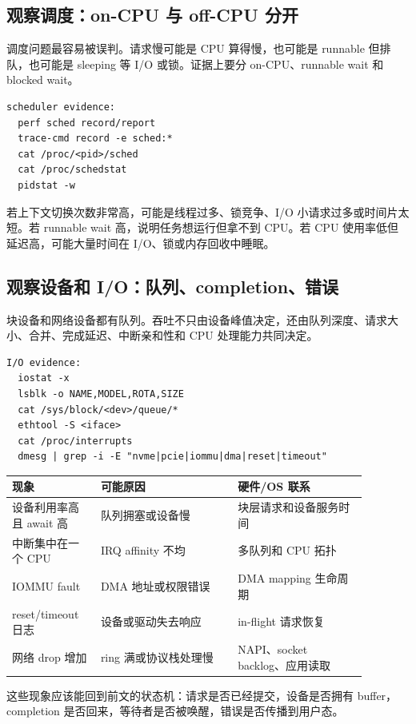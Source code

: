 \subsection{观察调度：on-CPU 与 off-CPU 分开}

调度问题最容易被误判。请求慢可能是 CPU 算得慢，也可能是 runnable 但排队，也可能是 sleeping 等 I/O 或锁。证据上要分 on-CPU、runnable wait 和 blocked wait。

\begin{lstlisting}
scheduler evidence:
  perf sched record/report
  trace-cmd record -e sched:*
  cat /proc/<pid>/sched
  cat /proc/schedstat
  pidstat -w
\end{lstlisting}

若上下文切换次数非常高，可能是线程过多、锁竞争、I/O 小请求过多或时间片太短。若 runnable wait 高，说明任务想运行但拿不到 CPU。若 CPU 使用率低但延迟高，可能大量时间在 I/O、锁或内存回收中睡眠。

\subsection{观察设备和 I/O：队列、completion、错误}

块设备和网络设备都有队列。吞吐不只由设备峰值决定，还由队列深度、请求大小、合并、完成延迟、中断亲和性和 CPU 处理能力共同决定。

\begin{lstlisting}
I/O evidence:
  iostat -x
  lsblk -o NAME,MODEL,ROTA,SIZE
  cat /sys/block/<dev>/queue/*
  ethtool -S <iface>
  cat /proc/interrupts
  dmesg | grep -i -E "nvme|pcie|iommu|dma|reset|timeout"
\end{lstlisting}

\begin{longtable}{p{0.22\linewidth}p{0.34\linewidth}p{0.32\linewidth}}
\toprule
现象 & 可能原因 & 硬件/OS 联系 \\
\midrule
设备利用率高且 await 高 & 队列拥塞或设备慢 & 块层请求和设备服务时间 \\
中断集中在一个 CPU & IRQ affinity 不均 & 多队列和 CPU 拓扑 \\
IOMMU fault & DMA 地址或权限错误 & DMA mapping 生命周期 \\
reset/timeout 日志 & 设备或驱动失去响应 & in-flight 请求恢复 \\
网络 drop 增加 & ring 满或协议栈处理慢 & NAPI、socket backlog、应用读取 \\
\bottomrule
\end{longtable}

这些现象应该能回到前文的状态机：请求是否已经提交，设备是否拥有 buffer，completion 是否回来，等待者是否被唤醒，错误是否传播到用户态。

